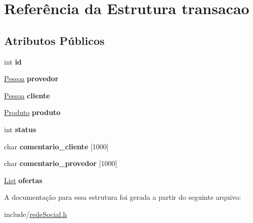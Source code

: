 \hypertarget{structtransacao}{}\section{Referência da Estrutura transacao}
\label{structtransacao}
\subsection*{Atributos Públicos}
\begin{DoxyCompactItemize}
\item 
\mbox{\label{structtransacao_aa4136876fb27948aedaf0dfb35e6b4ec}} 
int {\bfseries id}
\item 
\mbox{\label{structtransacao_ae8932bd1de3dd41906f357310aa1a3b4}} 
\hyperlink{structpessoa}{Pessoa} {\bfseries provedor}
\item 
\mbox{\label{structtransacao_a35f236c864743a8224cdcc4ef08875bf}} 
\hyperlink{structpessoa}{Pessoa} {\bfseries cliente}
\item 
\mbox{\label{structtransacao_a711d494042bf522088f3f25fc7299a21}} 
\hyperlink{structproduto}{Produto} {\bfseries produto}
\item 
\mbox{\label{structtransacao_ad1859124a1c74c98a285e73e2ef53ba5}} 
int {\bfseries status}
\item 
\mbox{\label{structtransacao_a1d863f578f35716ea5e7fade6814fc42}} 
char {\bfseries comentario\+\_\+cliente} \mbox{[}1000\mbox{]}
\item 
\mbox{\label{structtransacao_a7a0227cacf8430fe32e55048e35ca302}} 
char {\bfseries comentario\+\_\+provedor} \mbox{[}1000\mbox{]}
\item 
\mbox{\label{structtransacao_acbb11d435f016382611f086217b740ad}} 
\hyperlink{structlistNode}{List} {\bfseries ofertas}
\end{DoxyCompactItemize}


A documentação para essa estrutura foi gerada a partir do seguinte arquivo\+:\begin{DoxyCompactItemize}
\item 
include/\hyperlink{redeSocial_8h}{rede\+Social.\+h}\end{DoxyCompactItemize}

